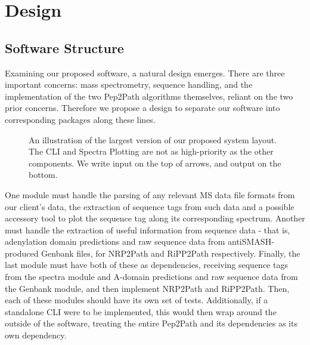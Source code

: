 \documentclass{l4proj}
\begin{document}
\chapter{Design}

\section{Software Structure}

Examining our proposed software, a natural design emerges. There are three important concerns: mass spectrometry, sequence handling, and the implementation of the two Pep2Path algorithms themselves, reliant on the two prior concerns. Therefore we propose a design to separate our software into corresponding packages along these lines. 

\begin{figure}
    \centering

    \caption{An illustration of the largest version of our proposed system layout. The CLI and Spectra Plotting are not as high-priority as the other
    components. We write input on the top of arrows, and output on the bottom.
    }

    \label{fig:system_layout}
\end{figure}

One module must handle the parsing of any relevant MS data file formats from our client's data, the extraction of sequence tags from such data and a possible accessory tool to plot the sequence tag along its corresponding spectrum. Another must handle the extraction of useful information from sequence data - that is, adenylation domain predictions and raw sequence data from antiSMASH-produced Genbank files, for NRP2Path and RiPP2Path respectively. Finally, the last module must have both of these as dependencies, receiving sequence tags from the spectra module and A-domain predictions and raw sequence data from the Genbank module, and then implement NRP2Path and RiPP2Path. Then, each of these modules should have its own set of tests. Additionally, if a standalone CLI were to be implemented, this would then wrap around the outside of the software, treating the entire Pep2Path and its dependencies as its own dependency.
\end{document}
